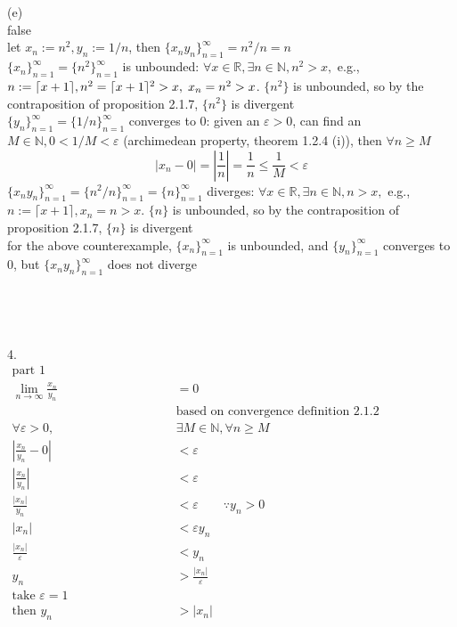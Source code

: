 \documentclass[12pt, border = 4pt, multi]{article} %
\begin{document}
\\
\\
(e)\\
false\\
let $x_n := n ^ 2, y_n := 1 / n$, then $\{x_n y_n\}_{n = 1} ^ {\infty} = n ^ 2 / n = n$\\
$\{x_n\}_{n = 1} ^ {\infty} = \{n ^ 2\}_{n = 1} ^ {\infty}$ is unbounded: $\forall x \in \mathbb{R}, \exists n \in \mathbb{N}, n ^ 2 > x, $ e.g., $n := \lceil x + 1 \rceil,\\
n ^ 2 = \lceil x + 1 \rceil ^ 2 > x,\;x_n = n ^ 2 > x$. $\{n ^ 2\}$ is unbounded, so by the contraposition of proposition 2.1.7, $\{n ^ 2\}$ is divergent\\
$\{y_n\}_{n = 1} ^ {\infty} = \{1 / n\}_{n = 1} ^ {\infty}$ converges to 0: given an $\varepsilon > 0$, can find an $M \in \mathbb{N}, 0 < 1 / M < \varepsilon$ (archimedean property, theorem 1.2.4 (i)), then $\forall n \geq M$
\[|x_n - 0| = \left|\frac{1}{n}\right| = \frac{1}{n} \leq \frac{1}{M} < \varepsilon\]
$\{x_n y_n\}_{n = 1} ^ {\infty} = \{n ^ 2 / n\}_{n = 1} ^ {\infty} = \{n\}_{n = 1} ^ {\infty}$ diverges: $\forall x \in \mathbb{R}, \exists n \in \mathbb{N}, n > x, $ e.g., $n := \lceil x + 1 \rceil, x_n = n > x$. $\{n\}$ is unbounded, so by the contraposition of proposition 2.1.7, $\{n\}$ is divergent\\
for the above counterexample, $\{x_n\}_{n = 1} ^ {\infty}$ is unbounded, and $\{y_n\}_{n = 1} ^ {\infty}$ converges to 0, but $\{x_n y_n\}_{n = 1} ^ {\infty}$ does not diverge\\
\\
\\
\\
\\
4.
\begin{align*}
\text{part 1} \hspace{10em}&\\
\lim_{n \rightarrow \infty} \frac{x_n}{y_n} &= 0 \hspace{10em}\\
&\text{based on convergence definition 2.1.2} \hspace{10em}\\
\forall \varepsilon > 0, &\exists M \in \mathbb{N}, \forall n \geq M\\
\left|\frac{x_n}{y_n} - 0\right| &< \varepsilon\\
\left|\frac{x_n}{y_n}\right| &< \varepsilon\\
\frac{|x_n|}{y_n} &< \varepsilon \qquad \because y_n > 0\\
|x_n| &< \varepsilon y_n\\
\frac{|x_n|}{\varepsilon} &< y_n\\
y_n &> \frac{|x_n|}{\varepsilon}\\
\text{take } \varepsilon = 1\\
\text{then } y_n &> |x_n|\\
\end{align*}
\end{document}
